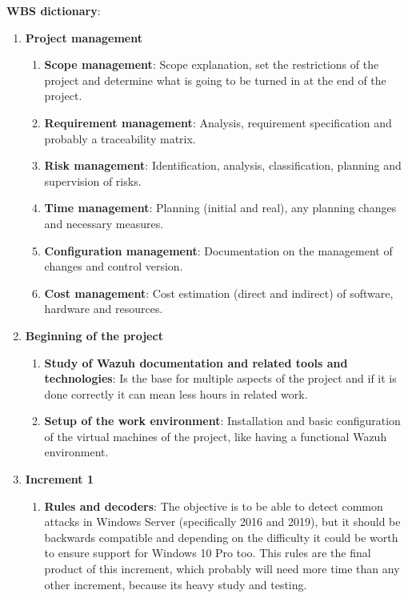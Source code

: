 \linej
\large\textbf{WBS dictionary}:\normalsize
\begin{enumerate}
	\item \textbf{Project management}
	\begin{enumerate}[label=\alph*]
		\item \textbf{Scope management}: Scope explanation, set the restrictions of the project and determine what is going to be turned in at the end of the project.
		\item \textbf{Requirement management}: Analysis, requirement specification and probably a traceability matrix.
		\item \textbf{Risk management}: Identification, analysis, classification, planning and supervision of risks.
		\item \textbf{Time management}: Planning (initial and real), any planning changes and necessary measures.
		\item \textbf{Configuration management}: Documentation on the management of changes and control version.
		\item \textbf{Cost management}: Cost estimation (direct and indirect) of software, hardware and resources.
	\end{enumerate}

	\item \textbf{Beginning of the project}
	\begin{enumerate}[label=\alph*]
		\item \textbf{Study of Wazuh documentation and related tools and technologies}: Is the base for multiple aspects of the project and if it is done correctly it can mean less hours in related work.
		\item \textbf{Setup of the work environment}: Installation and basic configuration of the virtual machines of the project, like having a functional Wazuh environment.
	\end{enumerate}

	\item \textbf{Increment 1}
	\begin{enumerate}[label=\alph*]
		\item \textbf{Rules and decoders}: The objective is to be able to detect common attacks in Windows Server (specifically 2016 and 2019), but it should be backwards compatible and depending on the difficulty it could be worth to ensure support for Windows 10 Pro too. This rules are the final product of this increment, which probably will need more time than any other increment, because its heavy study and testing.
	\end{enumerate}


\end{enumerate}

